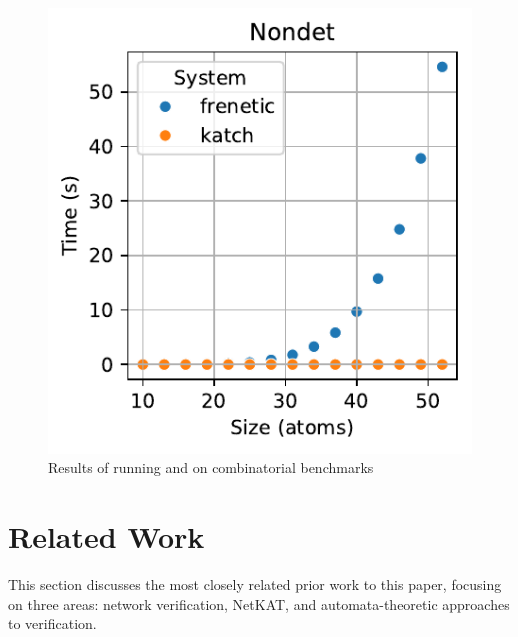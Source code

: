 \documentclass[acmsmall,dvipsnames,nonacm]{acmart}
\begin{document}
\begin{figure}
    \includegraphics[scale=0.53]{plots/Nondet_time_vs_size.pdf}
  \caption{Results of running \KATch{} and \Frenetic on combinatorial benchmarks}\label{fig:combinatorial}
\end{figure}

\section{Related Work}

This section discusses the most closely related prior work to this
paper, focusing on three areas: network verification, NetKAT, and
automata-theoretic approaches to verification.
\end{document}
